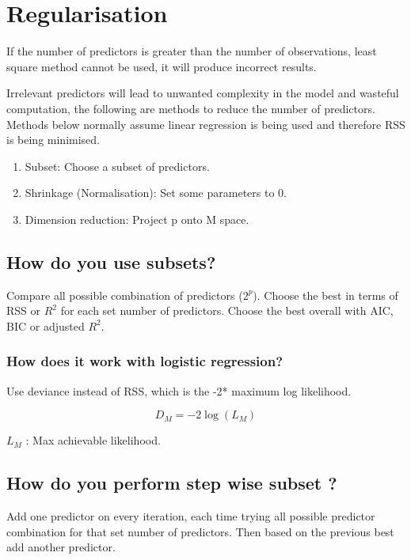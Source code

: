 \documentclass[11pt]{scrartcl} %
\begin{document}
\section{Regularisation}

If the number of predictors is greater than the number of observations, least square method cannot be 
used, it will produce incorrect results.

Irrelevant predictors will lead to unwanted complexity in the model and wasteful computation, the following are methods
to reduce the number of predictors.\\

Methods below normally assume linear regression is being used and therefore RSS is being minimised.

\begin{enumerate}
	\item Subset: Choose a subset of predictors.
	\item Shrinkage (Normalisation): Set some parameters to 0.
	\item Dimension reduction: Project p onto M space.
\end{enumerate}

\subsection{How do you use subsets?}

Compare all possible combination of predictors (\(2^p\)). 
Choose the best in terms of RSS or \(R^2\) for each set number of predictors.
Choose the best overall with AIC, BIC or adjusted \(R^2\).

\subsubsection{How does it work with logistic regression?}

Use deviance instead of RSS, which is the -2* maximum log likelihood.

\begin{equation}
	D_{M} = -2 \log (L_M)
\end{equation}

\(L_M\) : Max achievable likelihood.

\subsection{How do you perform step wise subset ?}

Add one predictor on every iteration, each time trying all possible predictor combination for that
set number of predictors. Then based on the previous best add another predictor. \\
\end{document}
